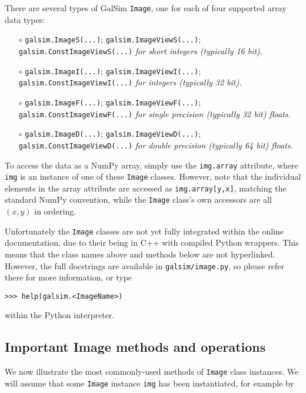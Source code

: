 \documentclass[preprint,11pt]{aastex}
\begin{document}
There are several types of GalSim \texttt{Image}, one for each of four
supported array data types:
\begin{itemize}

\item[$\circ$] \texttt{galsim.ImageS(...)}; \texttt{galsim.ImageViewS(...)};
  \texttt{galsim.ConstImageViewS(...)} \newline \emph{for short integers (typically 16 bit).}

\item[$\circ$] \texttt{galsim.ImageI(...)}; \texttt{galsim.ImageViewI(...)};
  \texttt{galsim.ConstImageViewI(...)} \newline \emph{for integers (typically 32 bit).}

\item[$\circ$] \texttt{galsim.ImageF(...)}; \texttt{galsim.ImageViewF(...)};
  \texttt{galsim.ConstImageViewF(...)} \newline \emph{for single precision (typically 32 bit)
  floats.}

\item[$\circ$] \texttt{galsim.ImageD(...)}; \texttt{galsim.ImageViewD(...)};
  \texttt{galsim.ConstImageViewD(...)} \newline \emph{for double precision (typically 64 bit)
  floats.}

\end{itemize}
To access the data as a NumPy array, simply use the \texttt{img.array}
attribute, where \texttt{img} is an instance of one of these
\texttt{Image} classes.  However, note that the individual elements in
the array attribute are accessed as \texttt{img.array[y,x]}, matching
the standard NumPy convention, while the \texttt{Image} class's own
accessors are all $(x,y)$ in ordering.

Unfortunately the \texttt{Image} classes are not yet fully integrated
within the online documentation, due to their being in C++ with
compiled Python wrappers.  This means that the class names above and
methods below are not hyperlinked.  However, the full docstrings are
available in \texttt{galsim/image.py}, so please refer there for more
information, or type

{\tt >>> help(galsim.<ImageName>)}

within the Python interpreter.

\subsection{Important Image methods and operations}\label{sect:imagemethods}
We now illustrate the most commonly-used methods of \texttt{Image}
class instances.  We will assume that some \texttt{Image} instance
\texttt{img} has been instantiated, for example by
\end{document}
